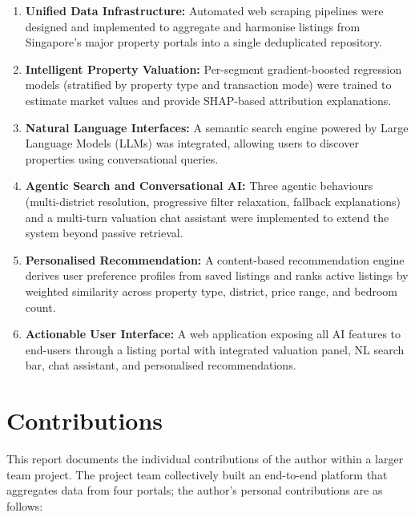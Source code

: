 \begin{enumerate}
    \item \textbf{Unified Data Infrastructure:} Automated web scraping pipelines were designed and implemented to aggregate and harmonise listings from Singapore's major property portals into a single deduplicated repository.
    \item \textbf{Intelligent Property Valuation:} Per-segment gradient-boosted regression models (stratified by property type and transaction mode) were trained to estimate market values and provide SHAP-based attribution explanations.
    \item \textbf{Natural Language Interfaces:} A semantic search engine powered by Large Language Models (LLMs) was integrated, allowing users to discover properties using conversational queries.
    \item \textbf{Agentic Search and Conversational AI:} Three agentic behaviours (multi-district resolution, progressive filter relaxation, fallback explanations) and a multi-turn valuation chat assistant were implemented to extend the system beyond passive retrieval.
    \item \textbf{Personalised Recommendation:} A content-based recommendation engine derives user preference profiles from saved listings and ranks active listings by weighted similarity across property type, district, price range, and bedroom count.
    \item \textbf{Actionable User Interface:} A web application exposing all AI features to end-users through a listing portal with integrated valuation panel, NL search bar, chat assistant, and personalised recommendations.
\end{enumerate}

\section{Contributions}

This report documents the individual contributions of the author within a larger team project.
The project team collectively built an end-to-end platform that aggregates data from four
portals; the author's personal contributions are as follows:


